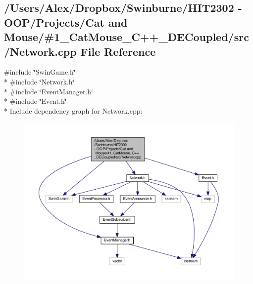 \subsection{/\-Users/\-Alex/\-Dropbox/\-Swinburne/\-H\-I\-T2302 -\/ O\-O\-P/\-Projects/\-Cat and Mouse/\#1\-\_\-\-Cat\-Mouse\-\_\-\-C++\-\_\-\-D\-E\-Coupled/src/\-Network.cpp File Reference}
\label{_network_8cpp}
{\ttfamily \#include \char`\"{}Swin\-Game.\-h\char`\"{}}\\*
{\ttfamily \#include \char`\"{}Network.\-h\char`\"{}}\\*
{\ttfamily \#include \char`\"{}Event\-Manager.\-h\char`\"{}}\\*
{\ttfamily \#include \char`\"{}Event.\-h\char`\"{}}\\*
Include dependency graph for Network.\-cpp\-:
\nopagebreak
\begin{figure}[H]
\begin{center}
\leavevmode
\includegraphics[width=350pt]{_network_8cpp__incl}
\end{center}
\end{figure}

